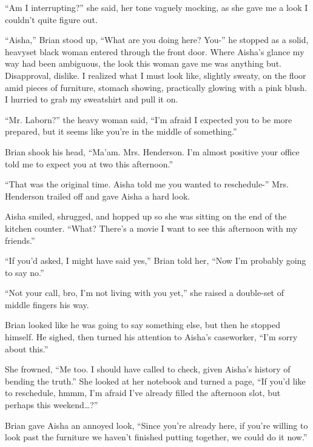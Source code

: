 ``Am I interrupting?'' she said, her tone vaguely mocking, as she gave me a look I couldn't quite figure out.



``Aisha,'' Brian stood up, ``What are you doing here?  You-'' he stopped as a solid, heavyset black woman entered through the front door.  Where Aisha's glance my way had been ambiguous, the look this woman gave me was anything but.  Disapproval, dislike.  I realized what I must look like, slightly sweaty, on the floor amid pieces of furniture, stomach showing, practically glowing with a pink blush.  I hurried to grab my sweatshirt and pull it on.



``Mr. Laborn?'' the heavy woman said, ``I'm afraid I expected you to be more prepared, but it seems like you're in the middle of something.''



Brian shook his head, ``Ma'am.  Mrs. Henderson.  I'm almost positive your office told me to expect you at two this afternoon.''



``That was the original time.  Aisha told me you wanted to reschedule-'' Mrs. Henderson trailed off and gave Aisha a hard look.



Aisha smiled, shrugged, and hopped up so she was sitting on the end of the kitchen counter.  ``What?  There's a movie I want to see this afternoon with my friends.''



``If you'd asked, I might have said yes,'' Brian told her, ``Now I'm probably going to say no.''



``Not your call, bro, I'm not living with you yet,'' she raised a double-set of middle fingers his way.



Brian looked like he was going to say something else, but then he stopped himself.  He sighed, then turned his attention to Aisha's caseworker, ``I'm sorry about this.''



She frowned, ``Me too.  I should have called to check, given Aisha's history of bending the truth.''  She looked at her notebook and turned a page, ``If you'd like to reschedule, hmmm, I'm afraid I've already filled the afternoon slot, but perhaps this weekend\ldots?''



Brian gave Aisha an annoyed look, ``Since you're already here, if you're willing to look past the furniture we haven't finished putting together, we could do it now.''



